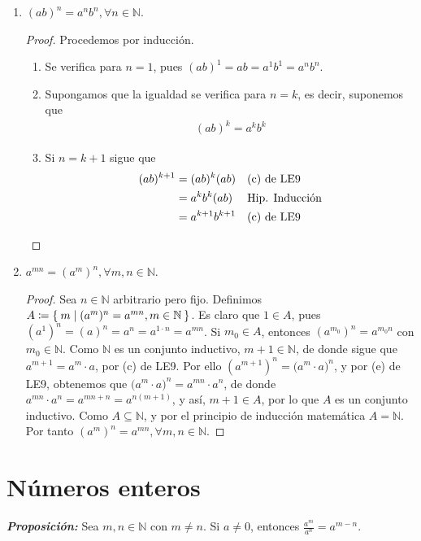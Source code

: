 \documentclass[11pt]{article}
\newcommand{\N}{\mathbb{N}}
\newcommand{\defined}{\coloneqq}
\newcommand{\bfit}[1]{\textbf{\textit{#1}}}
\let\set\Set
\begin{document}
\begin{enumerate}[label=\alph*)]
 \item $(ab)^n = a^nb^n, \forall n\in \N$.
 \begin{proof}
  Procedemos por inducción. \begin{enumerate}[label=\roman*)]
    \item Se verifica para $n=1$, pues $(ab)^1=ab=a^1b^1=a^nb^n$.
    \item Supongamos que la igualdad se verifica para $n=k$, es decir, suponemos que \begin{align*}
      (ab)^k = a^kb^k
    \end{align*}
    \item Si $n=k+1$ sigue que \begin{align*}
      (ab)^{k+1} &= (ab)^k (ab) && \text{(c) de LE9}\\
      &= a^kb^k (ab) && \text{Hip. Inducción}\\
      &= a^{k+1} b^{k+1} && \text{(c) de LE9} \qedhere 
    \end{align*}
  \end{enumerate}
 \end{proof}

 \item $a^{mn} = (a^m)^n, \forall m,n\in \N$.
 \begin{proof}
  Sea $n\in \N$ arbitrario pero fijo. Definimos $A\defined \set{m|(a^m)^n = a^{mn}, m\in \N}$. Es claro que $1\in A$, pues $(a^1)^n = (a)^n = a^n = a^{1\cdot n} = a^{mn}$. Si $m_0\in A$, entonces $(a^{m_0})^n = a^{m_0n}$ con $m_0\in \N$. Como $\N$ es un conjunto inductivo, $m+1\in \N$, de donde sigue que $a^{m+1} = a^m\cdot a$, por (c) de LE9. Por ello $(a^{m+1})^n = \big(a^m\cdot a\big)^n$, y por (e) de LE9, obtenemos que $\big(a^m\cdot a\big)^n = a^{mn}\cdot a^n$, de donde $a^{mn}\cdot a^n = a^{mn+n} = a^{n(m+1)}$, y así, $m+1\in A$, por lo que $A$ es un conjunto inductivo. Como $A\subseteq \N$, y por el principio de inducción matemática $A=\N$. Por tanto $(a^m)^n = a^{mn}, \forall m,n\in \N$.
 \end{proof}

 \end{enumerate}

 \section*{Números enteros}

 \bfit{Proposición:} Sea $m,n\in \N$ con $m\neq n$. Si $a\neq 0$, entonces $\frac{a^m}{a^n} = a^{m-n}$.
 
\end{document}
